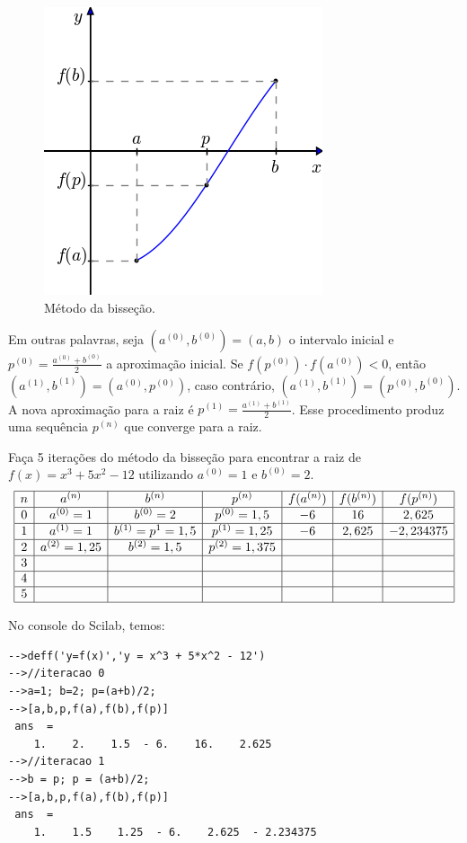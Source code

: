 \begin{figure}[ht]
  \centering
  \includegraphics[scale=0.5]{./cap_equacao1d/pics/metodo_da_bissecao/metodo_da_bissecao.png}
  \caption{Método da bisseção.}
  \label{fig:bisection_scheme}
\end{figure}

Em outras palavras, seja $(a^{(0)},b^{(0)})=(a,b)$ o intervalo inicial e $p^{(0)}=\frac{a^{(0)}+b^{(0)}}{2}$ a aproximação inicial. Se $f(p^{(0)})\cdot f(a^{(0)})<0$, então $(a^{(1)},b^{(1)})=(a^{(0)},p^{(0)})$, caso contrário, $(a^{(1)},b^{(1)})=(p^{(0)},b^{(0)})$. A nova aproximação para a raiz é $p^{(1)}=\frac{a^{(1)}+b^{(1)}}{2}$. Esse procedimento produz uma sequência $p^{(n)}$ que converge para a raiz.

\begin{ex}Faça 5 iterações do método da bisseção para encontrar a raiz de $f(x)=x^3+5x^2-12$ utilizando $a^{(0)}=1$ e $b^{(0)}=2$.
$$
\begin{array}{|c|c|c|c|c|c|c|}
\hline
n&a^{(n)}&b^{(n)}&p^{(n)}&f(a^{(n)})&f(b^{(n)})&f(p^{(n)})\\
\hline
0&a^{(0)}=1&b^{(0)}=2&p^{(0)}=1,5&-6 &16&2,625  \\
\hline
1&a^{(1)}=1&b^{(1)}=p^1=1,5&p^{(1)}=1,25&-6 &2,625&-2,234375  \\
\hline
2&a^{(2)}=1,25&b^{(2)}=1,5&p^{(2)}=1,375&&&\\
\hline
3&&&&&&\\
\hline
4&&&&&&\\
\hline
5&&&&&&\\
\hline
\end{array}
$$

\ifisscilab
No console do Scilab, temos:
\begin{verbatim}
-->deff('y=f(x)','y = x^3 + 5*x^2 - 12')
-->//iteracao 0
-->a=1; b=2; p=(a+b)/2;
-->[a,b,p,f(a),f(b),f(p)]
 ans  =
    1.    2.    1.5  - 6.    16.    2.625  
-->//iteracao 1
-->b = p; p = (a+b)/2;
-->[a,b,p,f(a),f(b),f(p)]
 ans  =
    1.    1.5    1.25  - 6.    2.625  - 2.234375
\end{verbatim}
\fi
\end{ex}

